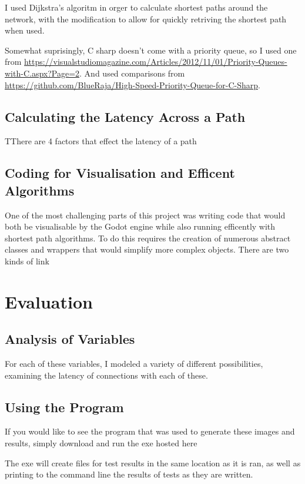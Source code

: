 \documentclass[12pt]{article}
\begin{document}
I used Dijkstra's algoritm in orger to calculate shortest paths around the network, with the modification to allow for quickly retriving the shortest path when used.

Somewhat suprisingly, C sharp doesn't come with a priority queue, so I used one from \url{https://visualstudiomagazine.com/Articles/2012/11/01/Priority-Queues-with-C.aspx?Page=2}. And used comparisons from \url{https://github.com/BlueRaja/High-Speed-Priority-Queue-for-C-Sharp}.

\subsection{Calculating the Latency Across a Path}

TThere are 4 factors that effect the latency of a path

\subsection{Coding for Visualisation and Efficent Algorithms}

One of the most challenging parts of this project was writing code that would both be visualisable by the Godot engine while also running efficently with shortest path algorithms. To do this requires the creation of numerous abstract classes and wrappers that would simplify more complex objects. There are two kinds of link

\section{Evaluation}

\subsection{Analysis of Variables}
For each of these variables, I modeled a variety of different possibilities, examining the latency of connections with each of these.


\subsection{Using the Program}

If you would like to see the program that was used to generate these images and results, simply download and run the exe hosted here %

The exe will create files for test results in the same location as it is ran, as well as printing to the command line the results of tests as they are written.
\end{document}
